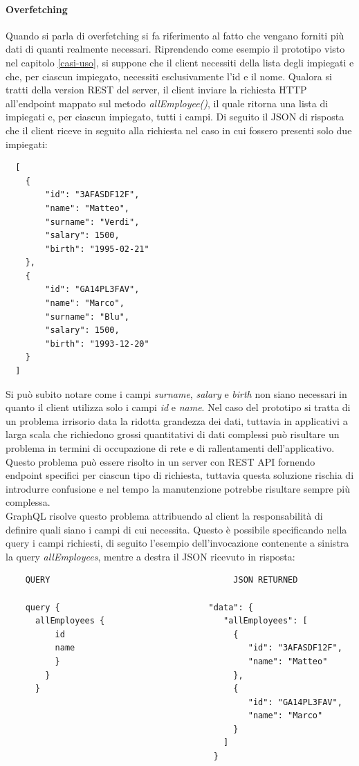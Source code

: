 \paragraph{Overfetching}
Quando si parla di overfetching si fa riferimento al fatto che vengano forniti più dati di quanti realmente necessari. Riprendendo come esempio il prototipo visto nel capitolo \ref{casi-uso}, si suppone che il client necessiti della lista degli impiegati e che, per ciascun impiegato, necessiti  esclusivamente l'id e il nome. Qualora si tratti della version REST del server, il client inviare la richiesta HTTP all'endpoint mappato sul metodo \textit{allEmployee()}, il quale ritorna una lista di impiegati e, per ciascun impiegato, tutti i campi. Di seguito il JSON di risposta che il client riceve in seguito alla richiesta nel caso in cui fossero presenti solo due impiegati:
\begin{verbatim}
  [
    {
        "id": "3AFASDF12F",
        "name": "Matteo",
        "surname": "Verdi",
        "salary": 1500,
        "birth": "1995-02-21"
    },
    {
        "id": "GA14PL3FAV",
        "name": "Marco",
        "surname": "Blu",
        "salary": 1500,
        "birth": "1993-12-20"
    }
  ]
\end{verbatim}
Si può subito notare come i campi \textit{surname}, \textit{salary} e \textit{birth} non siano necessari in quanto il client utilizza solo i campi \textit{id} e \textit{name}. Nel caso del prototipo si tratta di un problema irrisorio data la ridotta grandezza dei dati, tuttavia in applicativi a larga scala che richiedono grossi quantitativi di dati complessi può risultare un problema in termini di occupazione di rete e di rallentamenti dell'applicativo. Questo problema può essere risolto in un server con REST API fornendo endpoint specifici per ciascun tipo di richiesta, tuttavia questa soluzione rischia di introdurre confusione e nel tempo la manutenzione potrebbe risultare sempre più complessa.\\
GraphQL risolve questo problema attribuendo al client la responsabilità di definire quali siano i campi di cui necessita. Questo è possibile specificando nella query i campi richiesti, di seguito l'esempio dell'invocazione contenente a sinistra la query \textit{allEmployees}, mentre a destra il JSON ricevuto in risposta:
\begin{verbatim}
    QUERY                                     JSON RETURNED

    query {                              "data": {
      allEmployees {                        "allEmployees": [
          id                                  {
          name                                   "id": "3AFASDF12F",
          }                                      "name": "Matteo"
        }                                     },
      }                                       {
                                                 "id": "GA14PL3FAV",
                                                 "name": "Marco"
                                              }
                                            ]
                                          }
\end{verbatim}
